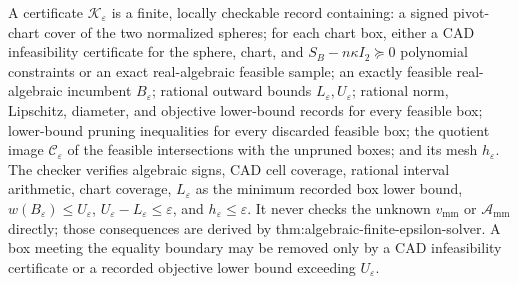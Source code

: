 A certificate \(\mathscr K_{\varepsilon}\) is a finite, locally checkable record containing: a signed pivot-chart cover of the two normalized spheres; for each chart box, either a CAD infeasibility certificate for the sphere, chart, and \(S_B-n\kappa I_2\succeq0\) polynomial constraints or an exact real-algebraic feasible sample; an exactly feasible real-algebraic incumbent \(B_{\varepsilon}\); rational outward bounds \(L_{\varepsilon},U_{\varepsilon}\); rational norm, Lipschitz, diameter, and objective lower-bound records for every feasible box; lower-bound pruning inequalities for every discarded feasible box; the quotient image \(\mathcal C_\varepsilon\) of the feasible intersections with the unpruned boxes; and its mesh \(h_{\varepsilon}\).  The checker verifies algebraic signs, CAD cell coverage, rational interval arithmetic, chart coverage, \(L_{\varepsilon}\) as the minimum recorded box lower bound, \(w(B_{\varepsilon})\le U_{\varepsilon}\), \(U_{\varepsilon}-L_{\varepsilon}\le\varepsilon\), and \(h_{\varepsilon}\le\varepsilon\).  It never checks the unknown \(v_{\mathrm{mm}}\) or \(\mathcal A_{\mathrm{mm}}\) directly; those consequences are derived by thm:algebraic-finite-epsilon-solver.  A box meeting the equality boundary may be removed only by a CAD infeasibility certificate or a recorded objective lower bound exceeding \(U_{\varepsilon}\).